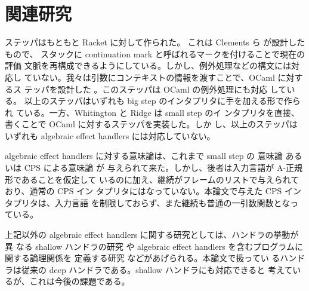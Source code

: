 \section{関連研究}
\label{section:related}

ステッパはもともと Racket に対して作られた。
これは Clements ら \cite{clements01} が設計したもので、
スタックに continuation mark と呼ばれるマークを付けることで現在の評価
文脈を再構成できるようにしている。しかし、例外処理などの構文には対応し
ていない。我々は引数にコンテキストの情報を渡すことで、OCaml に対するス
テッパを設計した \cite{FCA19}。このステッパは OCaml の例外処理にも対応
している。
以上のステッパはいずれも big step のインタプリタに手を加える形で作られ
ている。一方、Whitington と Ridge \cite{EPTCS294.3} は small step のイ
ンタプリタを直接、書くことで OCaml に対するステッパを実装した。しか
し、以上のステッパはいずれも algebraic effect handlers には対応していない。

algebraic effect handlers に対する意味論は、これまで small step の
意味論 \cite{10.1145/2500365.2500590}
あるいは CPS による意味論 \cite{e6cb0c3222794e48bf38cf44e46fe4aa} が
与えられて来た。しかし、後者は入力言語が A-正規形であることを仮定して
いるのに加え、継続がフレームのリストで与えられており、通常の CPS イン
タプリタにはなっていない。本論文で与えた CPS インタプリタは、入力言語
を制限しておらず、また継続も普通の一引数関数となっている。

上記以外の algebraic effect handlers に関する研究としては、ハンドラの挙動が異
なる shallow ハンドラの研究 \cite{10.1007/978-3-030-02768-1_22} や
algebraic effect handlers を含むプログラムに関する論理関係を
定義する研究 \cite{10.1145/3158096} などがあげられる。本論文で扱ってい
るハンドラは従来の deep ハンドラである。shallow ハンドラにも対応できると
考えているが、これは今後の課題である。

